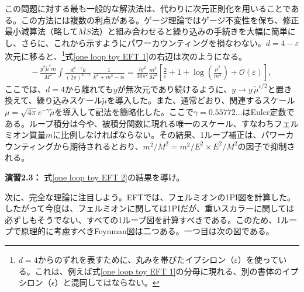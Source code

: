 この問題に対する最も一般的な解決法は、代わりに次元正則化を用いることである。この方法には複数の利点がある。ゲージ理論ではゲージ不変性を保ち、修正最小減算法（略して$\overline{MS}$法）と組み合わせると繰り込みの手続きを大幅に簡単にし、さらに、これから示すようにパワーカウンティングを損なわない。$d = 4 -\varepsilon$次元に移ると、\footnote{$d=4$からのずれを表すために、丸みを帯びたイプシロン（$\varepsilon$）を使っている。これは、例えば式\eqref{one loop toy EFT 1}の分母に現れる、別の書体のイプシロン（$\epsilon$）と混同してはならない。}式\eqref{one loop toy EFT 1}の右辺は次のようになる。
%
\begin{align} \label{one loop toy EFT 2}
	- \, \frac{y^2 \tilde{\mu}^\varepsilon m}{M^2} \int \frac{d^{4-\varepsilon} k}{(2 \pi)^{4-\varepsilon}} \, \frac{1}{k^2 + m^2 - i \epsilon} =\frac{i y^2}{16 \pi^2} \frac{m^3}{M^2} \left[ \frac{2}{\varepsilon} + 1 + \log\left(\frac{\mu^2}{m^2}\right) + \mathcal{O}(\varepsilon) \right] ,
\end{align}
%
ここでは、$d=4$から離れても$y$が無次元であり続けるように、$y \to y \, \tilde{\mu}^{\varepsilon/2}$と置き換えて、繰り込みスケール$\tilde \mu$を導入した。また、通常どおり、関連するスケール$\mu = \sqrt{4 \pi} e^{-\gamma} \tilde \mu$を導入して記法を簡略化した。ここで$\gamma = 0.55772...$はEuler定数である。ループ積分は今や、被積分関数に現れる唯一のスケール、すなわちフェルミオン質量$m$に比例しなければならない。その結果、1ループ補正は、パワーカウンティングから期待されるとおり、$m^2 /M^2 = m^2 /E^2 \times E^2 / M^2$の因子で抑制される。
%
\begin{eBox}
%
{\bf 演習2.3：} 式\eqref{one loop toy EFT 2}の結果を導け。
%
\end{eBox}
%

次に、完全な理論に注目しよう。EFTでは、フェルミオンの1PI図を計算した。したがって今度は、フェルミオンに関しては1PIだが、重いスカラーに関しては必ずしもそうでない、すべての1ループ図を計算すべきである。このため、1ループで原理的に考慮すべきFeynman図は二つある。一つ目は次の図である。
\vspace{3mm}

